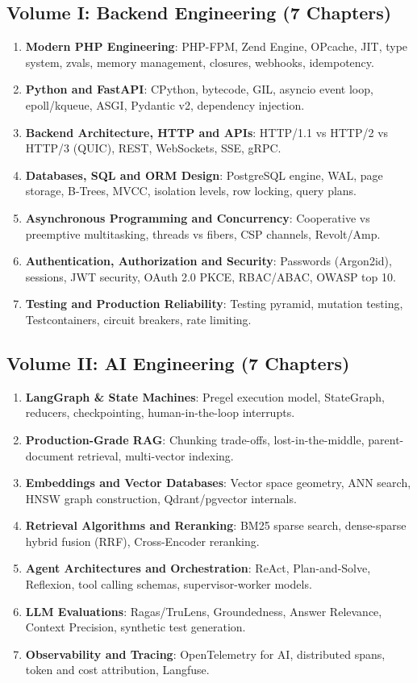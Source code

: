 \documentclass[11pt,oneside]{book}
\begin{document}
\subsection*{Volume I: Backend Engineering (7 Chapters)}
\begin{enumerate}[leftmargin=18pt]
  \item \textbf{Modern PHP Engineering}: PHP-FPM, Zend Engine, OPcache, JIT, type system, zvals, memory management, closures, webhooks, idempotency.
  \item \textbf{Python and FastAPI}: CPython, bytecode, GIL, asyncio event loop, epoll/kqueue, ASGI, Pydantic v2, dependency injection.
  \item \textbf{Backend Architecture, HTTP and APIs}: HTTP/1.1 vs HTTP/2 vs HTTP/3 (QUIC), REST, WebSockets, SSE, gRPC.
  \item \textbf{Databases, SQL and ORM Design}: PostgreSQL engine, WAL, page storage, B-Trees, MVCC, isolation levels, row locking, query plans.
  \item \textbf{Asynchronous Programming and Concurrency}: Cooperative vs preemptive multitasking, threads vs fibers, CSP channels, Revolt/Amp.
  \item \textbf{Authentication, Authorization and Security}: Passwords (Argon2id), sessions, JWT security, OAuth 2.0 PKCE, RBAC/ABAC, OWASP top 10.
  \item \textbf{Testing and Production Reliability}: Testing pyramid, mutation testing, Testcontainers, circuit breakers, rate limiting.
\end{enumerate}

\subsection*{Volume II: AI Engineering (7 Chapters)}
\begin{enumerate}[leftmargin=18pt]
  \item \textbf{LangGraph \& State Machines}: Pregel execution model, StateGraph, reducers, checkpointing, human-in-the-loop interrupts.
  \item \textbf{Production-Grade RAG}: Chunking trade-offs, lost-in-the-middle, parent-document retrieval, multi-vector indexing.
  \item \textbf{Embeddings and Vector Databases}: Vector space geometry, ANN search, HNSW graph construction, Qdrant/pgvector internals.
  \item \textbf{Retrieval Algorithms and Reranking}: BM25 sparse search, dense-sparse hybrid fusion (RRF), Cross-Encoder reranking.
  \item \textbf{Agent Architectures and Orchestration}: ReAct, Plan-and-Solve, Reflexion, tool calling schemas, supervisor-worker models.
  \item \textbf{LLM Evaluations}: Ragas/TruLens, Groundedness, Answer Relevance, Context Precision, synthetic test generation.
  \item \textbf{Observability and Tracing}: OpenTelemetry for AI, distributed spans, token and cost attribution, Langfuse.
\end{enumerate}
\end{document}

